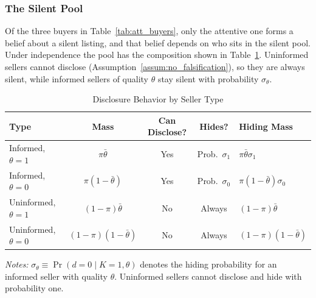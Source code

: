 \subsubsection{The Silent Pool}

Of the three buyers in Table~\ref{tab:att_buyers}, only the attentive one forms a belief about a silent listing, and that belief depends on who sits in the silent pool. Under independence the pool has the composition shown in Table~\ref{tab:who_hides}. Uninformed sellers cannot disclose (Assumption~\ref{assum:no_falsification}), so they are always silent, while informed sellers of quality $\theta$ stay silent with probability $\sigma_\theta$.

\begin{table}[htbp]
\centering
\caption{Disclosure Behavior by Seller Type}
\label{tab:who_hides}
\small
\renewcommand{\arraystretch}{1.3}
\setlength{\tabcolsep}{20pt}
\begin{tabular}{lcccl}
\toprule
\toprule
\textbf{Type} & \textbf{Mass} & \textbf{Can Disclose?} & \textbf{Hides?} & \textbf{Hiding Mass} \\
\midrule
Informed, $\theta=1$ & $\pi \bar{\theta}$ & Yes & Prob.\ $\sigma_1$ & $\pi \bar{\theta} \sigma_1$ \\
Informed, $\theta=0$ & $\pi (1-\bar{\theta})$ & Yes & Prob.\ $\sigma_0$ & $\pi (1-\bar{\theta}) \sigma_0$ \\
Uninformed, $\theta=1$ & $(1-\pi) \bar{\theta}$ & No & Always & $(1-\pi) \bar{\theta}$ \\
Uninformed, $\theta=0$ & $(1-\pi) (1-\bar{\theta})$ & No & Always & $(1-\pi) (1-\bar{\theta})$ \\
\bottomrule
\bottomrule
\end{tabular}

\vspace{0.5em}
\raggedright
\footnotesize
\textit{Notes:} $\sigma_\theta \equiv \Pr(d=0 \mid K=1, \theta)$ denotes the hiding probability for an informed seller with quality $\theta$. Uninformed sellers cannot disclose and hide with probability one.
\end{table}

